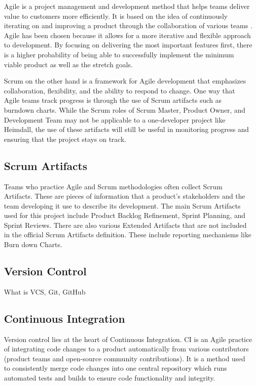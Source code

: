 \documentclass{article}
\begin{document}
Agile is a project management and development method that helps teams deliver value to customers more efficiently. It is based on the idea of continuously iterating on and improving a product through the collaboration of various teams \cite{what-is-agile}. Agile has been chosen because it allows for a more iterative and flexible approach to development. By focusing on delivering the most important features first, there is a higher probability of being able to successfully implement the minimum viable product as well as the stretch goals. \\\par Scrum on the other hand is a framework for Agile development that emphasizes collaboration, flexibility, and the ability to respond to change. One way that Agile teams track progress is through the use of Scrum artifacts such as burndown charts. While the Scrum roles of Scrum Master, Product Owner, and Development Team may not be applicable to a one-developer project like Heimdall, the use of these artifacts will still be useful in monitoring progress and ensuring that the project stays on track.


\subsection{Scrum Artifacts} \label{artifacts}
Teams who practice Agile and Scrum methodologies often collect Scrum Artifacts. These are pieces of information that a product's stakeholders and the team developing it use to describe its development. The main Scrum Artifacts used for this project include Product Backlog Refinement, Sprint Planning, and Sprint Reviews. There are also various Extended Artifacts that are not included in the official Scrum Artifacts definition. These include reporting mechanisms like Burn down Charts.



\subsection{Version Control} \label{version-ctrl}
What is VCS, Git, GitHub 



\subsection{Continuous Integration} \label{ci}
Version control lies at the heart of Continuous Integration. CI is an Agile practice of integrating code changes to a product automatically from various contributors (product teams and open-source community contributions). It is a method used to consistently merge code changes into one central repository which runs automated tests and builds to ensure code functionality and integrity.   
\end{document}
